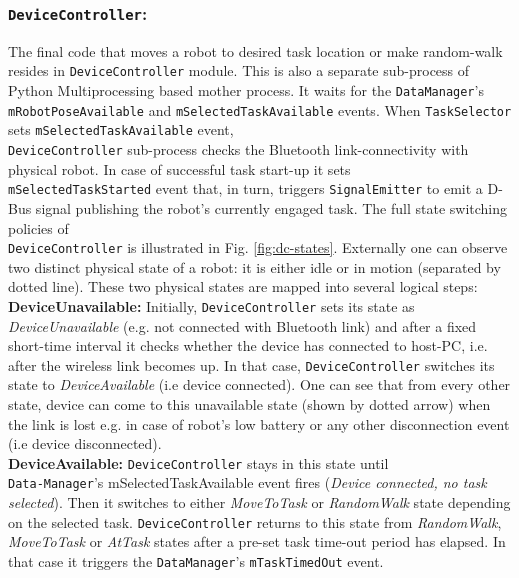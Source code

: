 \subsubsection*{\texttt{DeviceController}:}
\label{afm:impl:dc}
The final code that moves a robot to desired task location or make random-walk resides in \texttt{DeviceController} module. This is also a separate sub-process of Python Multiprocessing based mother process. It waits for the \texttt{DataManager}'s \texttt{mRobotPoseAvailable} and \texttt{mSelectedTaskAvailable} events. When \texttt{TaskSelector} sets  \texttt{mSelectedTaskAvailable} event,\\ \texttt{DeviceController} sub-process checks the Bluetooth link-connectivity with physical robot. In case of successful task start-up it sets\\ \texttt{mSelectedTaskStarted} event that, in turn, triggers \texttt{SignalEmitter} to emit a D-Bus signal publishing the robot's currently engaged task. The full state switching policies of\\ \texttt{DeviceController} is illustrated in Fig. \ref{fig:dc-states}. Externally one can observe two distinct physical state of a robot: it is either idle or in motion (separated by dotted line). These two physical states are mapped into several logical steps:\\
\textbf{DeviceUnavailable: }
Initially, \texttt{DeviceController} sets its state as \textit{DeviceUnavailable} (e.g. not connected with Bluetooth link) and after a fixed short-time interval it checks whether the device has connected to host-PC, i.e. after the  wireless link becomes up. In that case, \texttt{DeviceController} switches its state to \textit{DeviceAvailable} (i.e device connected). One can see that from every other state, device can come to this unavailable state (shown by dotted arrow) when the  link is lost e.g. in case of robot's low battery or any other disconnection event (i.e device disconnected).\\
\textbf{DeviceAvailable: }
\texttt{DeviceController} stays in this state until\\ \texttt{Data-Manager}'s mSelectedTaskAvailable event fires ({\em Device connected, no task selected}). Then it switches to either \textit{MoveToTask} or \textit{RandomWalk} state depending on the selected task.  \texttt{DeviceController}  returns to this state from \textit{RandomWalk}, \textit{MoveToTask} or \textit{AtTask} states after a pre-set task time-out period has elapsed.  In that case it triggers the \texttt{DataManager}'s \texttt{mTaskTimedOut} event.\\
